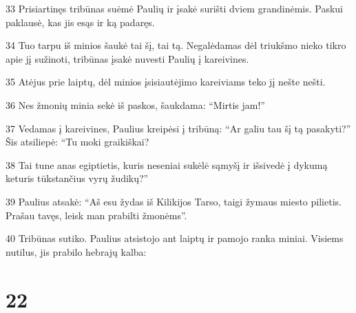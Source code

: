 \par 33 Prisiartinęs tribūnas suėmė Paulių ir įsakė surišti dviem grandinėmis. Paskui paklausė, kas jis esąs ir ką padaręs. 
\par 34 Tuo tarpu iš minios šaukė tai šį, tai tą. Negalėdamas dėl triukšmo nieko tikro apie jį sužinoti, tribūnas įsakė nuvesti Paulių į kareivines. 
\par 35 Atėjus prie laiptų, dėl minios įsisiautėjimo kareiviams teko jį nešte nešti. 
\par 36 Nes žmonių minia sekė iš paskos, šaukdama: “Mirtis jam!” 
\par 37 Vedamas į kareivines, Paulius kreipėsi į tribūną: “Ar galiu tau šį tą pasakyti?” Šis atsiliepė: “Tu moki graikiškai? 
\par 38 Tai tu­ne anas egiptietis, kuris neseniai sukėlė sąmyšį ir išsivedė į dykumą keturis tūkstančius vyrų žudikų?” 
\par 39 Paulius atsakė: “Aš esu žydas iš Kilikijos Tarso, taigi žymaus miesto pilietis. Prašau tavęs, leisk man prabilti žmonėms”. 
\par 40 Tribūnas sutiko. Paulius atsistojo ant laiptų ir pamojo ranka miniai. Visiems nutilus, jis prabilo hebrajų kalba:


\chapter{22}


